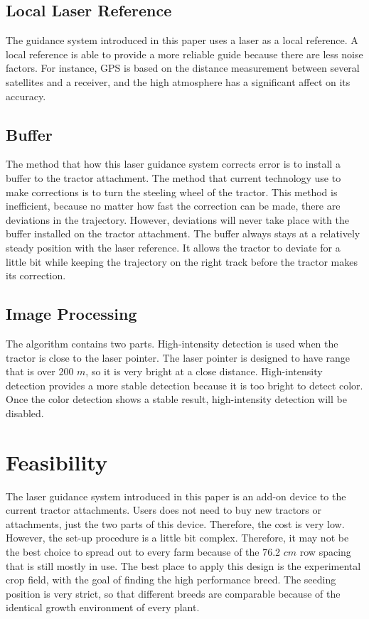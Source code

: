 \documentclass[letterpaper,12pt,oneside]{book}
\begin{document}
		\subsection{Local Laser Reference}
		The guidance system introduced in this paper uses a laser as a local reference. A local reference is able to provide a more reliable guide because there are less noise factors. For instance, GPS is based on the distance measurement between several satellites and a receiver, and the high atmosphere has a significant affect on its accuracy. 
		
		\subsection{Buffer}
		The method that how this laser guidance system corrects error is to install a buffer to the tractor attachment. The method that current technology use to make corrections is to turn the steeling wheel of the tractor. This method is inefficient, because no matter how fast the correction can be made, there are deviations in the trajectory. However, deviations will never take place with the buffer installed on the tractor attachment. The buffer always stays at a relatively steady position with the laser reference. It allows the tractor to deviate for a little bit while keeping the trajectory on the right track before the tractor makes its correction.
		
		\subsection{Image Processing}
		The algorithm contains two parts. High-intensity detection is used when the tractor is close to the laser pointer. The laser pointer is designed to have range that is over 200 $m$, so it is very bright at a close distance. High-intensity detection provides a more stable detection because it is too bright to detect color. Once the color detection shows a stable result, high-intensity detection will be disabled. 
		
		
		\section{Feasibility}
		The laser guidance system introduced in this paper is an add-on device to the current tractor attachments. Users does not need to buy new tractors or attachments, just the two parts of this device. Therefore, the cost is very low. However, the set-up procedure is a little bit complex. Therefore, it may not be the best choice to spread out to every farm because of the 76.2 $cm$ row spacing that is still mostly in use. The best place to apply this design is the experimental crop field, with the goal of finding the high performance breed. The seeding position is very strict, so that different breeds are comparable because of the identical growth environment of every plant. 
		
\end{document}
